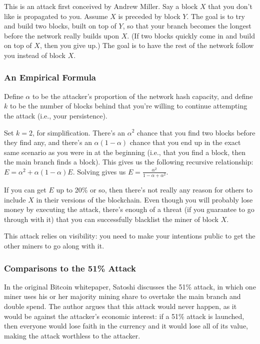 \documentclass[12pt]{article}
\begin{document}
This is an attack first conceived by Andrew Miller. Say a block $X$ that you don't like is propagated to you. Assume $X$ is preceded by block $Y$. The goal is to try and build two blocks, built on top of $Y$, so that your branch becomes the longest before the network really builds upon $X$. (If two blocks quickly come in and build on top of $X$, then you give up.) The goal is to have the rest of the network follow you instead of block $X$.

\subsubsection*{An Empirical Formula}

Define $\alpha$ to be the attacker's proportion of the network hash capacity, and define $k$ to be the number of blocks behind that you're willing to continue attempting the attack (i.e., your persistence).

Set $k=2$, for simplification. There's an $\alpha^2$ chance that you find two blocks before they find any, and there's an $\alpha(1-\alpha)$ chance that you end up in the exact same scenario as you were in at the beginning (i.e., that you find a block, then the main branch finds a block). This gives us the following recursive relationship: $E = \alpha^2 + \alpha(1-\alpha)E$. Solving gives us $E = \frac{\alpha^2}{1 - \alpha + \alpha^2}$.

If you can get $E$ up to 20\% or so, then there's not really any reason for others to include $X$ in their versions of the blockchain. Even though you will probably lose money by executing the attack, there's enough of a threat (if you guarantee to go through with it) that you can successfully blacklist the miner of block $X$.

This attack relies on visibility: you need to make your intentions public to get the other miners to go along with it.

\subsubsection*{Comparisons to the 51\% Attack}

In the original Bitcoin whitepaper, Satoshi discusses the 51\% attack, in which one miner uses his or her majority mining share to overtake the main branch and double spend. The author argues that this attack would never happen, as it would be against the attacker's economic interest: if a 51\% attack is launched, then everyone would lose faith in the currency and it would lose all of its value, making the attack worthless to the attacker.
\end{document}
